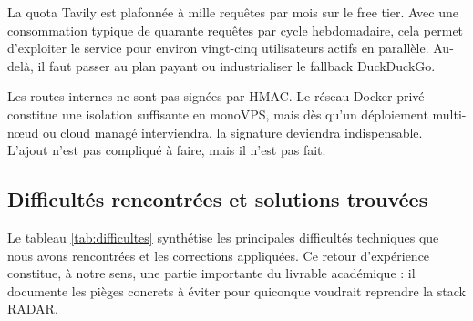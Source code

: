 \documentclass[12pt,a4paper,openany]{report}
\begin{document}
La quota Tavily est plafonnée à mille requêtes par mois sur le free tier. Avec une consommation typique de quarante requêtes par cycle hebdomadaire, cela permet d'exploiter le service pour environ vingt-cinq utilisateurs actifs en parallèle. Au-delà, il faut passer au plan payant ou industrialiser le fallback DuckDuckGo.

Les routes internes ne sont pas signées par HMAC. Le réseau Docker privé constitue une isolation suffisante en monoVPS, mais dès qu'un déploiement multi-nœud ou cloud managé interviendra, la signature deviendra indispensable. L'ajout n'est pas compliqué à faire, mais il n'est pas fait.




\subsection{Difficultés rencontrées et solutions trouvées}
\label{sec:difficultes}

Le tableau \ref{tab:difficultes} synthétise les principales difficultés techniques que nous avons rencontrées et les corrections appliquées. Ce retour d'expérience constitue, à notre sens, une partie importante du livrable académique : il documente les pièges concrets à éviter pour quiconque voudrait reprendre la stack RADAR.
\end{document}
